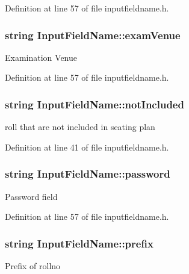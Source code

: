 Definition at line 57 of file inputfieldname.\-h.

\hypertarget{classInputFieldName_affaa2fe8246959748f43ea58f161b2b5}{
\subsubsection[{exam\-Venue}]{\setlength{\rightskip}{0pt plus 5cm}string Input\-Field\-Name\-::exam\-Venue}}\label{classInputFieldName_affaa2fe8246959748f43ea58f161b2b5}
Examination Venue 

Definition at line 57 of file inputfieldname.\-h.

\hypertarget{classInputFieldName_a9ee6ee84737e1199bdfd9fb24c82c2c7}{
\subsubsection[{not\-Included}]{\setlength{\rightskip}{0pt plus 5cm}string Input\-Field\-Name\-::not\-Included}}\label{classInputFieldName_a9ee6ee84737e1199bdfd9fb24c82c2c7}
roll that are not included in seating plan 

Definition at line 41 of file inputfieldname.\-h.

\hypertarget{classInputFieldName_a318f819ef4663d7e5f40d91180093cb9}{
\subsubsection[{password}]{\setlength{\rightskip}{0pt plus 5cm}string Input\-Field\-Name\-::password}}\label{classInputFieldName_a318f819ef4663d7e5f40d91180093cb9}
Password field 

Definition at line 57 of file inputfieldname.\-h.

\hypertarget{classInputFieldName_a161d155f8faca2c5dea1bbd607b17553}{
\subsubsection[{prefix}]{\setlength{\rightskip}{0pt plus 5cm}string Input\-Field\-Name\-::prefix}}\label{classInputFieldName_a161d155f8faca2c5dea1bbd607b17553}
Prefix of rollno 

